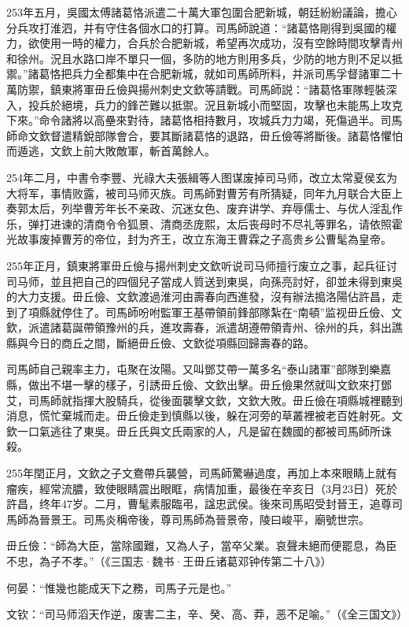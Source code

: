 253年五月，吳國太傅諸葛恪派遣二十萬大軍包圍合肥新城，朝廷紛紛議論，擔心分兵攻打淮泗，并有守住各個水口的打算。司馬師說道：“諸葛恪剛得到吳國的權力，欲使用一時的權力，合兵於合肥新城，希望再次成功，沒有空餘時間攻擊青州和徐州。況且水路口岸不單只一個，多防的地方則用多兵，少防的地方則不足以抵禦。”諸葛恪把兵力全都集中在合肥新城，就如司馬師所料，并派司馬孚督諸軍二十萬防禦，鎮東將軍毌丘儉與揚州刺史文欽等請戰。司馬師説：“諸葛恪軍隊輕裝深入，投兵於絕境，兵力的鋒芒難以抵禦。況且新城小而堅固，攻擊也未能馬上攻克下來。”命令諸將以高壘來對待，諸葛恪相持數月，攻城兵力力竭，死傷過半。司馬師命文欽督遣精銳部隊會合，要其斷諸葛恪的退路，毌丘儉等將斷後。諸葛恪懼怕而遁逃，文欽上前大敗敵軍，斬首萬餘人。

254年二月，中書令李豐、光祿大夫張緝等人图谋废掉司马师，改立太常夏侯玄为大将军，事情败露，被司马师灭族。司馬師對曹芳有所猜疑，同年九月联合大臣上奏郭太后，列举曹芳年长不亲政、沉迷女色、废弃讲学、弃辱儒士、与优人淫乱作乐，弹打进谏的清商令令狐景、清商丞庞熙，太后丧母时不尽礼等罪名，请依照霍光故事废掉曹芳的帝位，封为齐王，改立东海王曹霖之子高贵乡公曹髦為皇帝。

255年正月，鎮東將軍毌丘儉与揚州刺史文欽听说司马师擅行废立之事，起兵征讨司马师，並且把自己的四個兒子當成人質送到東吳，向孫亮討好，卻並未得到東吳的大力支援。毌丘儉、文欽渡過淮河由壽春向西進發，沒有辦法搗洛陽佔許昌，走到了項縣就停住了。司馬師吩咐監軍王基帶領前鋒部隊紮在“南頓”监视毌丘儉、文欽，派遣諸葛誕帶領豫州的兵，進攻壽春，派遣胡遵帶領青州、徐州的兵，斜出譙縣與今日的商丘之間，斷絕毌丘儉、文欽從項縣回歸壽春的路。

司馬師自己親率主力，屯聚在汝陽。又叫鄧艾帶一萬多名“泰山諸軍”部隊到樂嘉縣，做出不堪一擊的樣子，引誘毌丘儉、文欽出擊。毌丘儉果然就叫文欽來打鄧艾，司馬師就指揮大股騎兵，從後面襲擊文欽，文欽大敗。毌丘儉在項縣城裡聽到消息，慌忙棄城而走。毌丘儉走到慎縣以後，躲在河旁的草叢裡被老百姓射死。文欽一口氣逃往了東吳。毌丘氏與文氏兩家的人，凡是留在魏國的都被司馬師所诛殺。

255年閏正月，文欽之子文鴦帶兵襲營，司馬師驚嚇過度，再加上本來眼睛上就有瘤疾，經常流膿，致使眼睛震出眼眶，病情加重，最後在辛亥日（3月23日）死於許昌，终年47岁。二月，曹髦素服臨弔，諡忠武侯。後來司馬昭受封晉王，追尊司馬師為晉景王。司馬炎稱帝後，尊司馬師為晉景帝，陵曰峻平，廟號世宗。

毌丘儉：“師為大臣，當除國難，又為人子，當卒父業。哀聲未絕而便罷息，為臣不忠，為子不孝。”（《三国志·魏书·王毌丘诸葛邓钟传第二十八》）

何晏：“惟幾也能成天下之務，司馬子元是也。”

文钦：“司马师滔天作逆，废害二主，辛、癸、高、莽，恶不足喻。”（《全三国文》）

